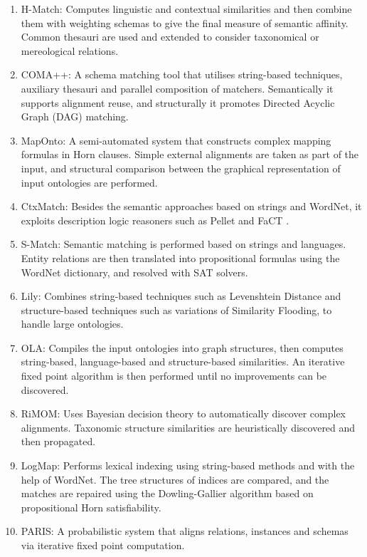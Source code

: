 \begin{spacing}{1.2}
\begin{enumerate}
	\item H-Match: Computes linguistic and contextual similarities and then combine them with weighting schemas to give the final measure of semantic affinity. Common thesauri are used and extended to consider taxonomical or mereological relations.
	\item COMA++: A schema matching tool that utilises string-based techniques, auxiliary thesauri and parallel composition of matchers. Semantically it supports alignment reuse, and structurally it promotes Directed Acyclic Graph (DAG) matching.
	\item MapOnto: A semi-automated system that constructs complex mapping formulas in Horn clauses. Simple external alignments are taken as part of the input, and structural comparison between the graphical representation of input ontologies are performed.
	\item CtxMatch: Besides the semantic approaches based on strings and WordNet, it exploits description logic reasoners such as Pellet \cite{DBLP:journals/ws/SirinPGKK07} and FaCT \cite{DBLP:conf/cade/TsarkovH06}.
	\item S-Match: Semantic matching is performed based on strings and languages. Entity relations are then translated into propositional formulas using the WordNet dictionary, and resolved with SAT solvers.
	\item Lily: Combines string-based techniques such as Levenshtein Distance and structure-based techniques such as variations of Similarity Flooding, to handle large ontologies.
	\item OLA: Compiles the input ontologies into graph structures, then computes string-based, language-based and structure-based similarities. An iterative fixed point algorithm is then performed until no improvements can be discovered.
	\item RiMOM: Uses Bayesian decision theory to automatically discover complex alignments. Taxonomic structure similarities are heuristically discovered and then propagated.
	\item LogMap: Performs lexical indexing using string-based methods and with the help of WordNet. The tree structures of indices are compared, and the matches are repaired using the Dowling-Gallier algorithm based on propositional Horn satisfiability.
	\item PARIS: A probabilistic system that aligns relations, instances and schemas via iterative fixed point computation.
\end{enumerate}
\end{spacing}

